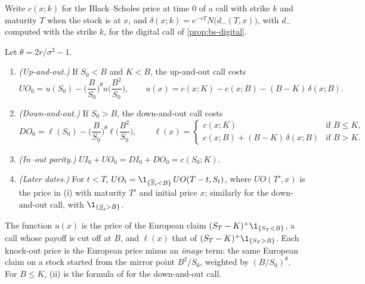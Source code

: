 Write $c(x;k)$ for the Black--Scholes price at time $0$ of a call with strike $k$ and maturity
$T$ when the stock is at $x$, and $\delta(x;k)=e^{-rT}N\big(d_-(T,x)\big)$, with $d_-$ computed
with the strike $k$, for the digital call of \cref{prop:bs-digital}.

\begin{proposition}\label{prop:exo-barrier}
Let $\theta=2r/\sigma^2-1$.
\begin{enumerate}[label=(\roman*)]
  \item \emph{(Up-and-out.)} If $S_0<B$ and $K<B$, the up-and-out call costs
    \[
      UO_0=u(S_0)-\Big(\frac B{S_0}\Big)^{\theta}u\Big(\frac{B^2}{S_0}\Big),\qquad
      u(x)=c(x;K)-c(x;B)-(B-K)\,\delta(x;B).
    \]
  \item \emph{(Down-and-out.)} If $S_0>B$, the down-and-out call costs
    \[
      DO_0=\ell(S_0)-\Big(\frac B{S_0}\Big)^{\theta}\ell\Big(\frac{B^2}{S_0}\Big),\qquad
      \ell(x)=\begin{cases}c(x;K)&\text{if }B\le K,\\ c(x;B)+(B-K)\,\delta(x;B)&\text{if }B>K.\end{cases}
    \]
  \item \emph{(In--out parity.)} $UI_0+UO_0=DI_0+DO_0=c(S_0;K)$.
  \item \emph{(Later dates.)} For $t<T$, $UO_t=\1_{\{\overline S_t<B\}}\,UO(T-t,S_t)$, where
    $UO(T',x)$ is the price in (i) with maturity $T'$ and initial price $x$; similarly for
    the down-and-out call, with $\1_{\{\underline S_t>B\}}$.
\end{enumerate}
\end{proposition}

The function $u(x)$ is the price of the European claim $(S_T-K)^+\1_{\{S_T<B\}}$, a call whose
payoff is cut off at $B$, and $\ell(x)$ that of $(S_T-K)^+\1_{\{S_T>B\}}$. Each knock-out price is
the European price minus an \emph{image} term: the same European claim on a stock started from
the mirror point $B^2/S_0$, weighted by $(B/S_0)^\theta$. For $B\le K$, (ii) is the formula of
\textcite{merton1973} for the down-and-out call.

